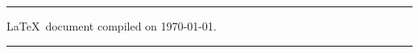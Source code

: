 \mbox{}
\vfill

{\small\onehalfspacing
\begin{center}

\noindent\rule{\textwidth}{1pt} %

    \LaTeX~document compiled on \today.

\noindent\rule{\textwidth}{.2pt} %

\end{center}
} %